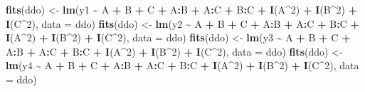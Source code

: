 \documentclass[
]{book}
\newenvironment{Shaded}{\begin{snugshade}}{\end{snugshade}}
\newcommand{\AttributeTok}[1]{\textcolor[rgb]{0.13,0.29,0.53}{#1}}
\newcommand{\DecValTok}[1]{\textcolor[rgb]{0.00,0.00,0.81}{#1}}
\newcommand{\FunctionTok}[1]{\textcolor[rgb]{0.13,0.29,0.53}{\textbf{#1}}}
\newcommand{\NormalTok}[1]{#1}
\newcommand{\OtherTok}[1]{\textcolor[rgb]{0.56,0.35,0.01}{#1}}
\newcommand{\SpecialCharTok}[1]{\textcolor[rgb]{0.81,0.36,0.00}{\textbf{#1}}}
\begin{document}
\begin{Shaded}
\begin{Highlighting}[]
\FunctionTok{fits}\NormalTok{(ddo) }\OtherTok{\textless{}{-}} \FunctionTok{lm}\NormalTok{(y1 }\SpecialCharTok{\textasciitilde{}}\NormalTok{ A }\SpecialCharTok{+}\NormalTok{ B }\SpecialCharTok{+}\NormalTok{ C }\SpecialCharTok{+}\NormalTok{ A}\SpecialCharTok{:}\NormalTok{B }\SpecialCharTok{+}\NormalTok{ A}\SpecialCharTok{:}\NormalTok{C }\SpecialCharTok{+}\NormalTok{ B}\SpecialCharTok{:}\NormalTok{C }\SpecialCharTok{+} \FunctionTok{I}\NormalTok{(A}\SpecialCharTok{\^{}}\DecValTok{2}\NormalTok{) }\SpecialCharTok{+} \FunctionTok{I}\NormalTok{(B}\SpecialCharTok{\^{}}\DecValTok{2}\NormalTok{) }\SpecialCharTok{+} \FunctionTok{I}\NormalTok{(C}\SpecialCharTok{\^{}}\DecValTok{2}\NormalTok{), }\AttributeTok{data =}\NormalTok{ ddo)}
\FunctionTok{fits}\NormalTok{(ddo) }\OtherTok{\textless{}{-}} \FunctionTok{lm}\NormalTok{(y2 }\SpecialCharTok{\textasciitilde{}}\NormalTok{ A }\SpecialCharTok{+}\NormalTok{ B }\SpecialCharTok{+}\NormalTok{ C }\SpecialCharTok{+}\NormalTok{ A}\SpecialCharTok{:}\NormalTok{B }\SpecialCharTok{+}\NormalTok{ A}\SpecialCharTok{:}\NormalTok{C }\SpecialCharTok{+}\NormalTok{ B}\SpecialCharTok{:}\NormalTok{C }\SpecialCharTok{+} \FunctionTok{I}\NormalTok{(A}\SpecialCharTok{\^{}}\DecValTok{2}\NormalTok{) }\SpecialCharTok{+} \FunctionTok{I}\NormalTok{(B}\SpecialCharTok{\^{}}\DecValTok{2}\NormalTok{) }\SpecialCharTok{+} \FunctionTok{I}\NormalTok{(C}\SpecialCharTok{\^{}}\DecValTok{2}\NormalTok{), }\AttributeTok{data =}\NormalTok{ ddo)}
\FunctionTok{fits}\NormalTok{(ddo) }\OtherTok{\textless{}{-}} \FunctionTok{lm}\NormalTok{(y3 }\SpecialCharTok{\textasciitilde{}}\NormalTok{ A }\SpecialCharTok{+}\NormalTok{ B }\SpecialCharTok{+}\NormalTok{ C }\SpecialCharTok{+}\NormalTok{ A}\SpecialCharTok{:}\NormalTok{B }\SpecialCharTok{+}\NormalTok{ A}\SpecialCharTok{:}\NormalTok{C }\SpecialCharTok{+}\NormalTok{ B}\SpecialCharTok{:}\NormalTok{C }\SpecialCharTok{+} \FunctionTok{I}\NormalTok{(A}\SpecialCharTok{\^{}}\DecValTok{2}\NormalTok{) }\SpecialCharTok{+} \FunctionTok{I}\NormalTok{(B}\SpecialCharTok{\^{}}\DecValTok{2}\NormalTok{) }\SpecialCharTok{+} \FunctionTok{I}\NormalTok{(C}\SpecialCharTok{\^{}}\DecValTok{2}\NormalTok{), }\AttributeTok{data =}\NormalTok{ ddo)}
\FunctionTok{fits}\NormalTok{(ddo) }\OtherTok{\textless{}{-}} \FunctionTok{lm}\NormalTok{(y4 }\SpecialCharTok{\textasciitilde{}}\NormalTok{ A }\SpecialCharTok{+}\NormalTok{ B }\SpecialCharTok{+}\NormalTok{ C }\SpecialCharTok{+}\NormalTok{ A}\SpecialCharTok{:}\NormalTok{B }\SpecialCharTok{+}\NormalTok{ A}\SpecialCharTok{:}\NormalTok{C }\SpecialCharTok{+}\NormalTok{ B}\SpecialCharTok{:}\NormalTok{C }\SpecialCharTok{+} \FunctionTok{I}\NormalTok{(A}\SpecialCharTok{\^{}}\DecValTok{2}\NormalTok{) }\SpecialCharTok{+} \FunctionTok{I}\NormalTok{(B}\SpecialCharTok{\^{}}\DecValTok{2}\NormalTok{) }\SpecialCharTok{+} \FunctionTok{I}\NormalTok{(C}\SpecialCharTok{\^{}}\DecValTok{2}\NormalTok{), }\AttributeTok{data =}\NormalTok{ ddo)}
\end{Highlighting}
\end{Shaded}
\end{document}
